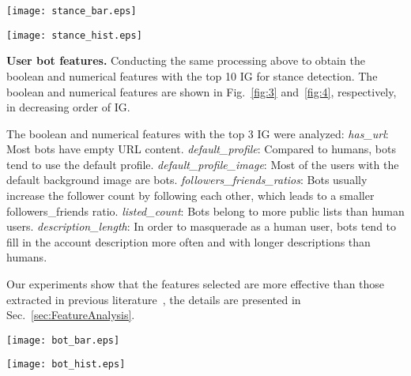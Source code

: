 \documentclass[10pt,twocolumn,letterpaper]{article}
\begin{document}
\begin{figure*}[t]
  \centering
   \texttt{[image: stance\_bar.eps]}
   \vspace{-0.1cm}
   \caption{Distribution of boolean features with top 10 IG in stance detection.}
   \label{fig:1}
\end{figure*}
\vspace{-0.1cm}
\begin{figure*}[t]
  \centering
   \texttt{[image: stance\_hist.eps]}
   \vspace{-0.1cm}
   \caption{Distribution of numerical features with top 10 IG in stance detection.}
   \label{fig:2}
\end{figure*}


\noindent
\textbf{User bot features.}
Conducting the same processing above to obtain the boolean and numerical features with the top 10 IG for stance detection. The boolean and numerical features are shown in Fig.~\ref{fig:3} and~\ref{fig:4}, respectively, in decreasing order of IG.

The boolean and numerical features with the top 3 IG were analyzed: \emph{has\_url}: Most bots have empty URL content. \emph{default\_profile}: Compared to humans, bots tend to use the default profile. \emph{default\_profile\_image}: Most of the users with the default background image are bots. \emph{followers\_friends\_ratios}: Bots usually increase the follower count by following each other, which leads to a smaller followers\_friends ratio. \emph{listed\_count}: Bots belong to more public lists than human users. \emph{description\_length}: In order to masquerade as a human user, bots tend to fill in the account description more often and with longer descriptions than humans.

Our experiments show that the features selected are more effective than those extracted in previous literature~\cite{Alpher06,Alpher39,Alpher50}, the details are presented in Sec.~\ref{sec:FeatureAnalysis}.

\begin{figure*}[t]
  \centering
   \texttt{[image: bot\_bar.eps]}
   \vspace{-0.1cm}
   \caption{Distribution of boolean features with top 10 IG in bot detection.}
   \label{fig:3}
\end{figure*}

\begin{figure*}[t]
  \centering
   \texttt{[image: bot\_hist.eps]}
   \vspace{-0.1cm}
   \caption{Distribution of numerical features with top 10 IG in bot detection.}
   \label{fig:4}
\end{figure*}
\end{document}
